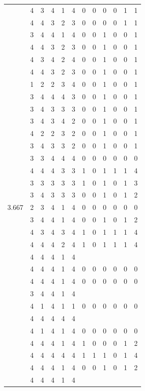 \documentclass[]{msu-thesis}
\theoremstyle{definition}
\theoremstyle{definition}
\theoremstyle{definition}
\theoremstyle{remark}
\begin{document}
\begin{table}
{\begin{tabular}[t]{rrrrrrrrrrrr}
 & 4 & 3 & 4 & 1 & 4 & 0 & 0 & 0 & 0 & 1 & 1\\
 & 4 & 4 & 3 & 2 & 3 & 0 & 0 & 0 & 0 & 1 & 1\\
 & 3 & 4 & 4 & 1 & 4 & 0 & 0 & 1 & 0 & 0 & 1\\
 & 4 & 4 & 3 & 2 & 3 & 0 & 0 & 1 & 0 & 0 & 1\\
 & 4 & 3 & 4 & 2 & 4 & 0 & 0 & 1 & 0 & 0 & 1\\
 & 4 & 4 & 3 & 2 & 3 & 0 & 0 & 1 & 0 & 0 & 1\\
 & 1 & 2 & 2 & 3 & 4 & 0 & 0 & 1 & 0 & 0 & 1\\
 & 3 & 4 & 4 & 4 & 3 & 0 & 0 & 1 & 0 & 0 & 1\\
 & 3 & 4 & 3 & 3 & 3 & 0 & 0 & 1 & 0 & 0 & 1\\
 & 3 & 4 & 3 & 4 & 2 & 0 & 0 & 1 & 0 & 0 & 1\\
 & 4 & 2 & 2 & 3 & 2 & 0 & 0 & 1 & 0 & 0 & 1\\
 & 3 & 4 & 3 & 3 & 2 & 0 & 0 & 1 & 0 & 0 & 1\\
 & 3 & 3 & 4 & 4 & 4 & 0 & 0 & 0 & 0 & 0 & 0\\
 & 4 & 4 & 4 & 3 & 3 & 1 & 0 & 1 & 1 & 1 & 4\\
 & 3 & 3 & 3 & 3 & 3 & 1 & 0 & 1 & 0 & 1 & 3\\
 & 3 & 4 & 3 & 3 & 3 & 0 & 0 & 1 & 0 & 1 & 2\\
3.667 & 2 & 3 & 4 & 1 & 4 & 0 & 0 & 0 & 0 & 0 & 0\\
 & 3 & 4 & 4 & 1 & 4 & 0 & 0 & 1 & 0 & 1 & 2\\
 & 4 & 3 & 4 & 3 & 4 & 1 & 0 & 1 & 1 & 1 & 4\\
 & 4 & 4 & 4 & 2 & 4 & 1 & 0 & 1 & 1 & 1 & 4\\
 & 4 & 4 & 4 & 1 & 4 &  &  &  &  &  & \\
 & 4 & 4 & 4 & 1 & 4 & 0 & 0 & 0 & 0 & 0 & 0\\
 & 4 & 4 & 4 & 1 & 4 & 0 & 0 & 0 & 0 & 0 & 0\\
 & 3 & 4 & 4 & 1 & 4 &  &  &  &  &  & \\
 & 4 & 1 & 4 & 1 & 1 & 0 & 0 & 0 & 0 & 0 & 0\\
 & 4 & 4 & 4 & 4 & 4 &  &  &  &  &  & \\
 & 4 & 1 & 4 & 1 & 4 & 0 & 0 & 0 & 0 & 0 & 0\\
 & 4 & 4 & 4 & 1 & 4 & 1 & 0 & 0 & 0 & 1 & 2\\
 & 4 & 4 & 4 & 4 & 4 & 1 & 1 & 1 & 0 & 1 & 4\\
 & 4 & 4 & 4 & 1 & 4 & 0 & 0 & 1 & 0 & 1 & 2\\
 & 4 & 4 & 4 & 1 & 4 &  &  &  &  &  & \\

\end{tabular}}
\end{table}
\end{document}
